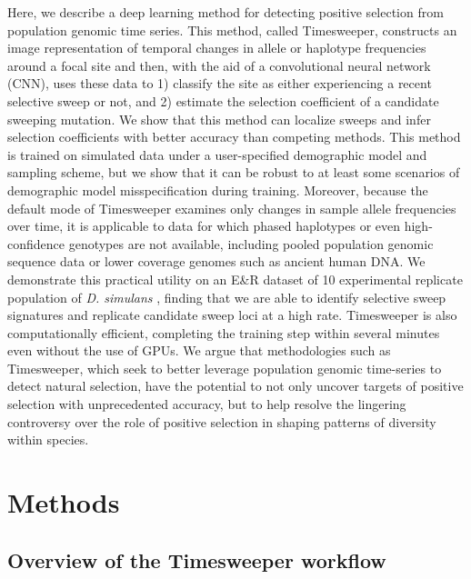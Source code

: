 Here, we describe a deep learning method for detecting positive selection from population genomic time series. This method, called Timesweeper, constructs an image representation of temporal changes in allele or haplotype frequencies around a focal site and then, with the aid of a convolutional neural network (CNN), uses these data to 1) classify the site as either experiencing a recent selective sweep or not, and 2) estimate the selection coefficient of a candidate sweeping mutation. We show that this method can localize sweeps and infer selection coefficients with better accuracy than competing methods. This method is trained on simulated data under a user-specified demographic model and sampling scheme, but we show that it can be robust to at least some scenarios of demographic model misspecification during training. Moreover, because the default mode of Timesweeper examines only changes in sample allele frequencies over time, it is applicable to data for which phased haplotypes or even high-confidence genotypes are not available, including pooled population genomic sequence data or lower coverage genomes such as ancient human DNA. We demonstrate this practical utility on an E\&R dataset of 10 experimental replicate population of \textit{D. simulans} \cite{barghiGeneticRedundancyFuels2019}, finding that we are able to identify selective sweep signatures and replicate candidate sweep loci at a high rate. Timesweeper is also computationally efficient, completing the training step within several minutes even without the use of GPUs. We argue that methodologies such as Timesweeper, which seek to better leverage population genomic time-series to detect natural selection, have the potential to not only uncover targets of positive selection with unprecedented accuracy, but to help resolve the lingering controversy over the role of positive selection in shaping patterns of diversity within species.

\newpage
\section{Methods}
\subsection{Overview of the Timesweeper workflow}


